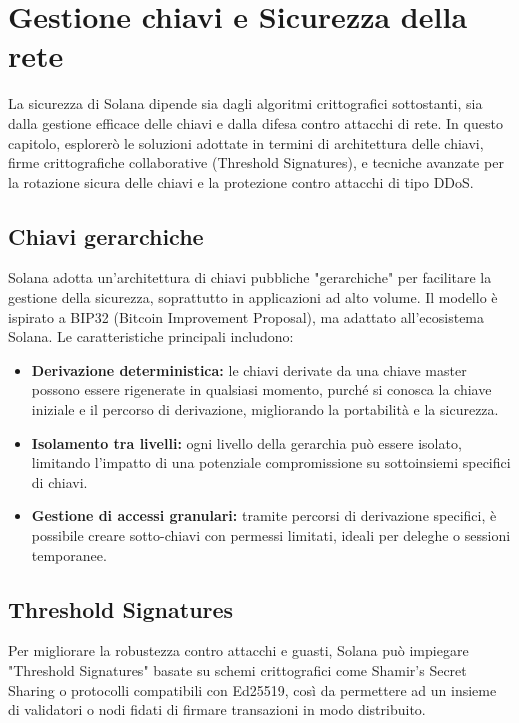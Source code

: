 \documentclass[a4paper,12pt]{report}
\begin{document}
	\chapter{Gestione chiavi e Sicurezza della rete}
	La sicurezza di Solana dipende sia dagli algoritmi crittografici sottostanti, sia dalla gestione efficace delle chiavi e dalla difesa contro attacchi di rete. In questo capitolo, esplorerò le soluzioni adottate in termini di architettura delle chiavi, firme crittografiche collaborative (Threshold Signatures), e tecniche avanzate per la rotazione sicura delle chiavi e la protezione contro attacchi di tipo DDoS.
	
	\section{Chiavi gerarchiche}
	Solana adotta un’architettura di chiavi pubbliche "gerarchiche" per facilitare la gestione della sicurezza, soprattutto in applicazioni ad alto volume. Il modello è ispirato a BIP32 (Bitcoin Improvement Proposal), ma adattato all’ecosistema Solana. Le caratteristiche principali includono:
	
	\begin{itemize}
		\item \textbf{Derivazione deterministica:} le chiavi derivate da una chiave master possono essere rigenerate in qualsiasi momento, purché si conosca la chiave iniziale e il percorso di derivazione, migliorando la portabilità e la sicurezza.
		\item \textbf{Isolamento tra livelli:} ogni livello della gerarchia può essere isolato, limitando l’impatto di una potenziale compromissione su sottoinsiemi specifici di chiavi.
		\item \textbf{Gestione di accessi granulari:} tramite percorsi di derivazione specifici, è possibile creare sotto-chiavi con permessi limitati, ideali per deleghe o sessioni temporanee.
	\end{itemize}
	
	\section{Threshold Signatures}
	Per migliorare la robustezza contro attacchi e guasti, Solana può impiegare "Threshold Signatures" basate su schemi crittografici come Shamir’s Secret Sharing o protocolli compatibili con Ed25519, così da permettere ad un insieme di validatori o nodi fidati di firmare transazioni in modo distribuito.
	
\end{document}
